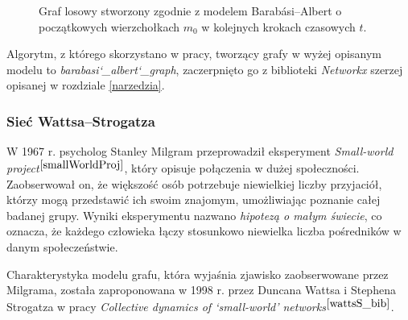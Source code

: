 \documentclass[a4paper, 12pt, twoside, openright]{article}
\begin{document}
\begin{figure}[!p]
		\quad
		
		\caption[]{Graf losowy stworzony zgodnie z modelem Barabási–Albert o początkowych wierzchołkach $m_0$ w kolejnych krokach czasowych $t$.}
		\label{BarabasiImg1}
	\end{figure}
 	
 	
 	Algorytm, z którego skorzystano w pracy, tworzący grafy w wyżej opisanym modelu to \textit{barabasi\char`_albert\char`_graph}, zaczerpnięto go z biblioteki \textit{Networkx} szerzej opisanej w rozdziale \ref{narzedzia}.
	
	
\subsubsection{Sieć Wattsa–Strogatza} \label{WSWS}
\indent\par
	W 1967 r. psycholog Stanley Milgram przeprowadził eksperyment \textit{Small-world project}$^{\cite{smallWorldProj}}$, który opisuje połączenia w dużej społeczności. Zaobserwował on, że większość osób potrzebuje niewielkiej liczby przyjaciół, którzy mogą przedstawić ich swoim znajomym, umożliwiając poznanie całej badanej grupy. Wyniki eksperymentu nazwano \textit{hipotezą o małym świecie}, co oznacza, że każdego człowieka łączy stosunkowo niewielka liczba pośredników w danym społeczeństwie.
	
	Charakterystyka modelu grafu, która wyjaśnia zjawisko zaobserwowane przez Milgrama, została zaproponowana w 1998 r. przez Duncana Wattsa i Stephena Strogatza w pracy \textit{Collective dynamics of ‘small-world’ networks}$^{\cite{wattsS_bib}}$. 
	
\end{document}
